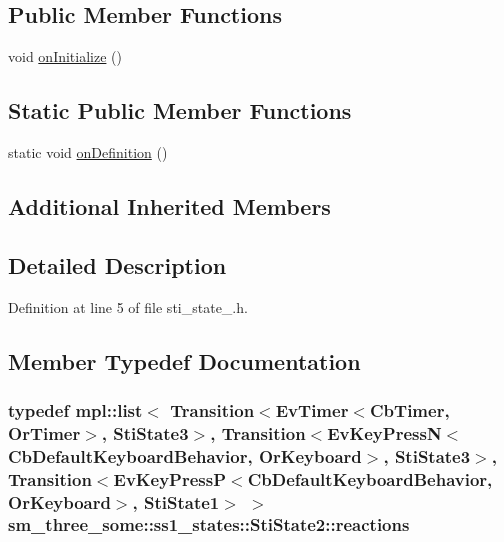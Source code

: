 \subsection*{Public Member Functions}
\begin{DoxyCompactItemize}
\item 
void \hyperlink{structsm__three__some_1_1ss1__states_1_1StiState2_a0d768a8c4a77afef4b077583fbb1405b}{on\+Initialize} ()
\end{DoxyCompactItemize}
\subsection*{Static Public Member Functions}
\begin{DoxyCompactItemize}
\item 
static void \hyperlink{structsm__three__some_1_1ss1__states_1_1StiState2_a3c8404e63c0b42765b802f5d199abe9b}{on\+Definition} ()
\end{DoxyCompactItemize}
\subsection*{Additional Inherited Members}


\subsection{Detailed Description}


Definition at line 5 of file sti\+\_\+state\+\_.\+h.



\subsection{Member Typedef Documentation}
\subsubsection[{\texorpdfstring{reactions}{reactions}}]{\setlength{\rightskip}{0pt plus 5cm}typedef mpl\+::list$<$ Transition$<$Ev\+Timer$<$Cb\+Timer, {\bf Or\+Timer}$>$, {\bf Sti\+State3}$>$, Transition$<$Ev\+Key\+PressN$<$Cb\+Default\+Keyboard\+Behavior, {\bf Or\+Keyboard}$>$, {\bf Sti\+State3}$>$, Transition$<$Ev\+Key\+PressP$<$Cb\+Default\+Keyboard\+Behavior, {\bf Or\+Keyboard}$>$, {\bf Sti\+State1}$>$ $>$ {\bf sm\+\_\+three\+\_\+some\+::ss1\+\_\+states\+::\+Sti\+State2\+::reactions}}\hypertarget{structsm__three__some_1_1ss1__states_1_1StiState2_a3a6dd1b1f9cf7033bbb6e0c6bbc76f5c}{}\label{structsm__three__some_1_1ss1__states_1_1StiState2_a3a6dd1b1f9cf7033bbb6e0c6bbc76f5c}


